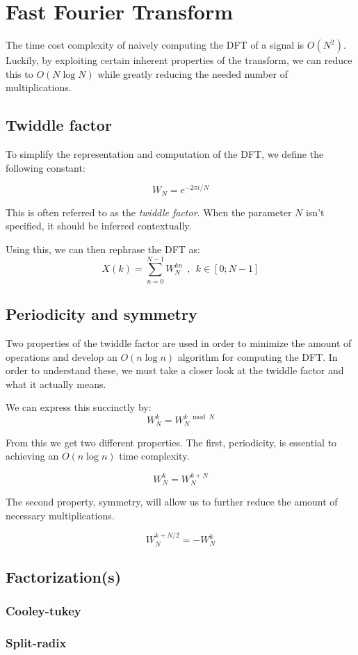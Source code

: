 \section{Fast Fourier Transform}

The time cost complexity of naively computing the DFT of a signal is $O(N^2)$.
Luckily, by exploiting certain inherent properties of the transform,
we can reduce this to $O(N \log N)$ while greatly reducing the needed number of multiplications.

\subsection{Twiddle factor}

To simplify the representation and computation of the DFT,
we define the following constant:

\begin{equation}
    W_N = e^{-2 \pi i / N}
\end{equation}

This is often referred to as the \textit{twiddle factor}.
When the parameter $N$ isn't specified,
it should be inferred contextually.

Using this, we can then rephrase the DFT as:
\begin{equation}
    X(k) = \sum_{n = 0}^{N - 1} W_N^{kn}~~,~~k \in [0; N - 1]
\end{equation}

\subsection{Periodicity and symmetry}

Two properties of the twiddle factor are used in order to minimize the amount of operations
and develop an $O(n \log n)$ algorithm for computing the DFT.
In order to understand these,
we must take a closer look at the twiddle factor and what it actually means.

We can express this succinctly by:
\begin{equation}
    W_N^{k} = W_N^{k \mod N}
\end{equation}

From this we get two different properties.
The first, periodicity, is essential to achieving an $O(n \log n)$ time complexity.

\begin{equation}
    W^k_N = W^{k + N}_N
\end{equation}

The second property, symmetry,
will allow us to further reduce the amount of necessary multiplications.

\begin{equation}
    W^{k + N/2}_N = -W^k_N
\end{equation}

\subsection{Factorization(s)}

\subsubsection{Cooley-tukey}

\subsubsection{Split-radix}

